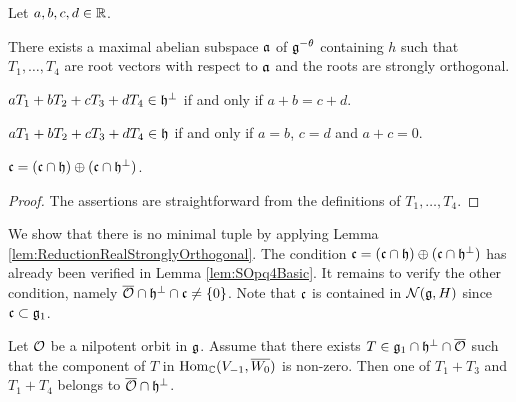 \begin{lemma} \label{lem:SOpq4Basic}
	Let $a, b, c, d \in \mathbb{R}$.
	\begin{enumparen}
		\item There exists a maximal abelian subspace $\mathfrak{a}$ of $\mathfrak{g}^{-\theta}$ containing $h$ such that $T_1, \ldots, T_4$ are root vectors with respect to $\mathfrak{a}$ and the roots are strongly orthogonal.
		\item $aT_1 + bT_2 + cT_3 + dT_4 \in \mathfrak{h}^\perp$ if and only if $a + b = c + d$.
		\item $aT_1 + bT_2 + cT_3 + dT_4 \in \mathfrak{h}$ if and only if $a = b$, $c = d$ and $a + c = 0$.
		\item $\mathfrak{c} = (\mathfrak{c} \cap \mathfrak{h}) \oplus (\mathfrak{c} \cap \mathfrak{h}^\perp)$.
	\end{enumparen}
\end{lemma}

\begin{proof}
	The assertions are straightforward from the definitions of $T_1, \ldots, T_4$.
\end{proof}

We show that there is no minimal tuple by applying Lemma \ref{lem:ReductionRealStronglyOrthogonal}.
The condition $\mathfrak{c}=(\mathfrak{c} \cap \mathfrak{h}) \oplus (\mathfrak{c} \cap \mathfrak{h}^\perp)$ has already been verified in Lemma \ref{lem:SOpq4Basic}.
It remains to verify the other condition, namely $\overline{\mathcal{O}} \cap \mathfrak{h}^\perp \cap \mathfrak{c} \neq \left\{0 \right\}$.
Note that $\mathfrak{c}$ is contained in $\mathcal{N}(\mathfrak{g}, H)$ since $\mathfrak{c} \subset \mathfrak{g}_1$.

\begin{lemma} \label{lem:SOpq4}
	Let $\mathcal{O}$ be a nilpotent orbit in $\mathfrak{g}$.
	Assume that there exists $T \in \mathfrak{g}_1 \cap \mathfrak{h}^\perp \cap \overline{\mathcal{O}}$ such that the component of $T$ in $\mathrm{Hom}_{\mathbb{C}}(V_{-1}, \overline{W_0})$ is non-zero.
	Then one of $T_1 + T_3$ and $T_1 + T_4$ belongs to $\overline{\mathcal{O}} \cap \mathfrak{h}^\perp$.
\end{lemma}


